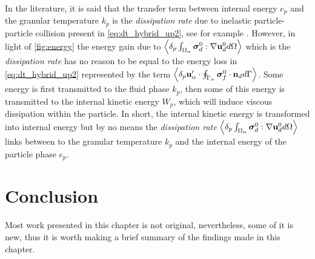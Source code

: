 In the literature, it is said that the transfer term between internal energy $e_p$ and the granular temperature $k_p$ is the \textit{dissipation rate} due to inelastic particle-particle collision present in \ref{eq:dt_hybrid_up2}, see for example \citet{fox2014multiphase,rao2008introduction}. 
However, in light of \ref{fig:energy} the energy gain due to  $\left<\delta_p \int_{\Omega_{\alpha}} \bm{\sigma}_d^0:\mathbf{\nabla} \textbf{u}_d^0 d\Omega\right>$ which is the \textit{dissipation rate} has no reason to be equal to the energy loss in \ref{eq:dt_hybrid_up2} represented by the term $\left<\delta_p \textbf{u}_\alpha' \cdot \oint_{\Gamma_{\alpha}} \bm{\sigma}_f^0 \cdot \textbf{n}_d d\Gamma\right>$. 
Some energy is first transmitted to the fluid phase $k_p$, then some of this energy is transmitted to the internal kinetic energy $W_p$, which will induce viscous dissipation within the particle. 
In short, the internal kinetic energy is transformed into internal energy but by no means the \textit{dissipation rate} $\left<\delta_p \int_{\Omega_{\alpha}} \bm{\sigma}_d^0:\mathbf{\nabla} \textbf{u}_d^0 d\Omega\right>$ links between to the granular temperature $k_p$ and the internal energy of the particle phase $e_p$. 


\section{Conclusion}

Most work presented in this chapter is not original, nevertheless, some of it is new, thus it is worth making a brief summary of the findings made in this chapter. 

